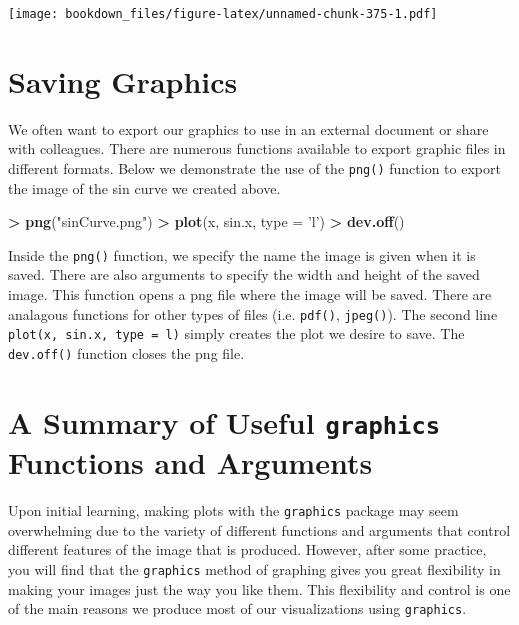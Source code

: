 \documentclass[]{krantz}
\makeatletter
\newenvironment{Shaded}{\begin{snugshade}}{\end{snugshade}}
\newcommand{\KeywordTok}[1]{\textcolor[rgb]{0.27,0.27,0.27}{\textbf{#1}}}
\newcommand{\DataTypeTok}[1]{\textcolor[rgb]{0.27,0.27,0.27}{#1}}
\newcommand{\StringTok}[1]{\textcolor[rgb]{0.5,0.5,0.5}{#1}}
\newcommand{\OperatorTok}[1]{\textcolor[rgb]{0.43,0.43,0.43}{\textbf{#1}}}
\newcommand{\NormalTok}[1]{#1}
\newenvironment{kframe}{%
\medskip{}
\setlength{\fboxsep}{.8em}
 \def\at@end@of@kframe{}%
 \ifinner\ifhmode%
  \def\at@end@of@kframe{\end{minipage}}%
  \begin{minipage}{\columnwidth}%
 \fi\fi%
 \def\FrameCommand##1{\hskip\@totalleftmargin \hskip-\fboxsep
 \colorbox{shadecolor}{##1}\hskip-\fboxsep
     \hskip-\linewidth \hskip-\@totalleftmargin \hskip\columnwidth}%
 \MakeFramed {\advance\hsize-\width
   \@totalleftmargin\z@ \linewidth\hsize
   \@setminipage}}%
 {\par\unskip\endMakeFramed%
 \at@end@of@kframe}
\renewenvironment{Shaded}{\begin{kframe}}{\end{kframe}}
\makeatother
\begin{document}
\texttt{[image: bookdown\_files/figure-latex/unnamed-chunk-375-1.pdf]}

\section{Saving Graphics}\label{saving-graphics-1}

We often want to export our graphics to use in an external document or
share with colleagues. There are numerous functions available to export
graphic files in different formats. Below we demonstrate the use of the
\texttt{png()} function to export the image of the sin curve we created
above.

\begin{Shaded}
\begin{Highlighting}[]
\OperatorTok{>}\StringTok{ }\KeywordTok{png}\NormalTok{(}\StringTok{"sinCurve.png"}\NormalTok{)}
\OperatorTok{>}\StringTok{ }\KeywordTok{plot}\NormalTok{(x, sin.x, }\DataTypeTok{type =} \StringTok{'l'}\NormalTok{)}
\OperatorTok{>}\StringTok{ }\KeywordTok{dev.off}\NormalTok{()}
\end{Highlighting}
\end{Shaded}

Inside the \texttt{png()} function, we specify the name the image is
given when it is saved. There are also arguments to specify the width
and height of the saved image. This function opens a png file where the
image will be saved. There are analagous functions for other types of
files (i.e. \texttt{pdf()}, \texttt{jpeg()}). The second line
\texttt{plot(x,\ sin.x,\ type\ =\ \textquotesingle{}l\textquotesingle{})}
simply creates the plot we desire to save. The \texttt{dev.off()}
function closes the png file.

\section{\texorpdfstring{A Summary of Useful \texttt{graphics} Functions
and
Arguments}{A Summary of Useful graphics Functions and Arguments}}\label{a-summary-of-useful-graphics-functions-and-arguments}

Upon initial learning, making plots with the \texttt{graphics} package
may seem overwhelming due to the variety of different functions and
arguments that control different features of the image that is produced.
However, after some practice, you will find that the \texttt{graphics}
method of graphing gives you great flexibility in making your images
just the way you like them. This flexibility and control is one of the
main reasons we produce most of our visualizations using
\texttt{graphics}.
\end{document}
